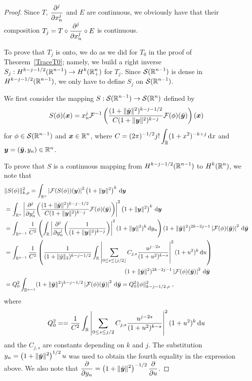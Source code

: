 \begin{proof}
Since $T$, $\displaystyle \frac{\displaystyle \partial^{j}{}} {\displaystyle \partial x_n^{j}}$ and $E$ are continuous,
we obviously have that their composition
$\displaystyle T_j = T \circ \frac{\displaystyle \partial^{j}{}} {\displaystyle \partial x_n^{j}} \circ E$ is continuous.

To prove that $T_j$ is onto, we do as we did for $T_0$ in the proof
of Theorem~\ref{TraceT0}; namely, we build a right inverse
$\displaystyle S_j : H^{k-j-1/2}(\mathbb{R}^{n-1}) \to H^k(\mathbb{R}^n_+)$ for $T_j$.
Since $\displaystyle \mathcal{S}(\mathbb{R}^{n-1})$ is dense in
$\displaystyle H^{k-j-1/2}(\mathbb{R}^{n-1})$,
we only have to define $S_j$ on $\displaystyle \mathcal{S}(\mathbb{R}^{n-1})$.

We first consider the mapping $\displaystyle S:\mathcal{S}(\mathbb{R}^{n-1}) \to \mathcal{S}(\mathbb{R}^n)$
defined by
\[
S(\phi)({\bm{x}}) = x_n^j \mathcal{F}^{-1}\left(
\frac{(1+\|\breve{{\bm{y}}}\|^2)^{k-j-1/2}}{C (1+ \|{\bm{y}}\|^2)^{k-j}}
\mathcal{F}(\phi)(\breve{{\bm{y}}}) \right)({\bm{x}})
\]
for $\displaystyle \phi \in \mathcal{S}(\mathbb{R}^{n-1})$ and
$\displaystyle {\bm{x}} \in \mathbb{R}^n$, where
$\displaystyle C = (2\pi)^{-1/2} j! \int_{\mathbb{R}} (1+x^2)^{-k+j}\,\mathrm{d}{x}$ and
${\bm{y}} = (\breve{{\bm{y}}},y_n) \in \mathbb{R}^n$.

To prove that $S$ is a continuous mapping from
$\displaystyle H^{k-j-1/2}(\mathbb{R}^{n-1})$ to $\displaystyle H^k(\mathbb{R}^n)$, we
note that
\begin{align*}
&\|S(\phi)\|_{k,\rho}^2 = \int_{\RR^n} \left| \F(S(\phi))(\VEC{y}) \right|^2
\left( 1 + \|\VEC{y}\|^2\right)^k \dx{\VEC{y}} \\
& = \int_{\RR^n} \left|\pdfdxn{\left(
\frac{(1+\|\breve{\VEC{y}}\|^2)^{k-j-1/2}}{C (1+ \|\VEC{y}\|^2)^{k-j}}
\F(\phi)(\breve{\VEC{y}}) \right)}{y_n}{j} \right|^2
\left( 1 + \|\VEC{y}\|^2\right)^k \dx{\VEC{y}} \\
& = \int_{\RR^{n-1}} \frac{1}{C^2} \left( \int_{\RR}
\left| \pdfdxn{\left( \frac{1}{(1+ \|\VEC{y}\|^2)^{k-j}}
  \right)}{y_n}{j} \right|^2 (1 + \|\VEC{y}\|^2)^k  \dx{y_n} \right)
(1+\|\breve{\VEC{y}}\|^2)^{2k-2j-1} \left| \F(\phi)(\breve{\VEC{y}}) \right|^2
  \dx{\breve{\VEC{y}}} \\
& = \int_{\RR^{n-1}} \frac{1}{C^2} \left( \frac{1}{(1+\|\breve{y}\|_2)^{k-j-1/2}}
\int_{\RR} \left| \sum_{0 \leq s \leq \intpt{j/2}}
C_{j,s} \frac{u^{j-2s}}{(1+u^2)^{k-s}} \right|^2 (1 + u^2)^k \dx{u} \right) \\
&\hspace{20em} (1+\|\breve{\VEC{y}}\|^2)^{2k-2j-1} 
  \left|\F(\phi)(\breve{\VEC{y}}) \right|^2 \dx{\breve{\VEC{y}}} \\
& = Q_0^2  \int_{\RR^{n-1}}
(1+\|\breve{\VEC{y}}\|^2)^{k-j-1/2} \left| \F(\phi)(\breve{\VEC{y}}) \right|^2
  \dx{\breve{\VEC{y}}} = Q_0^2 \|\phi\|_{k-j-1/2.\rho}^2 \ ,
\end{align*}
where
\[
Q_0^2 =  = \frac{1}{C^2} \int_{\mathbb{R}} \left| \sum_{0 \leq s \leq j/2}
C_{j,s} \frac{u^{j-2s}}{(1+u^2)^{k-s}} \right|^2 (1 + u^2)^k \,\mathrm{d}{u}
\]
and the $C_{j,s}$ are constants depending on $k$ and $j$.
The substitution
$\displaystyle y_n = \left(1 + \|\breve{{\bm{y}}}\|^2\right)^{1/2} u$
was used to obtain the fourth equality in the expression above.  We
also note that $\displaystyle \frac{\partial{}}{\partial y_n} =
\left(1 + \|\breve{{\bm{y}}}\|^2\right)^{-1/2} \frac{\partial{}}{\partial u}$.


\end{proof}

